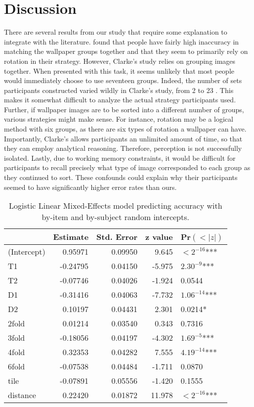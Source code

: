 \section{Discussion}
There are several results from our study that require some explanation to integrate with the literature. \citet{clarke} found that people have fairly high inaccuracy in matching the wallpaper groups together and that they seem to primarily rely on rotation in their strategy. However, Clarke's study relies on grouping images together. When presented with this task, it seems unlikely that most people would immediately choose to use seventeen groups. Indeed, the number of sets participants constructed varied wildly in Clarke's study, from 2 to 23 \citep{clarke}. This makes it somewhat difficult to analyze the actual strategy participants used. Further, if wallpaper images are to be sorted into a different number of groups, various strategies might make sense. For instance, rotation may be a logical method with six groups, as there are six types of rotation a wallpaper can have. Importantly, Clarke's allows participants an unlimited amount of time, so that they can employ analytical reasoning. Therefore, perception is not successfully isolated. Lastly, due to working memory constraints, it would be difficult for participants to recall precisely what type of image corresponded to each group as they continued to sort. These confounds could explain why their participants seemed to have significantly higher error rates than ours.

\begin{table}
\centering
\begin{tabular}{|l|rrrl|}
\hline
& Estimate & Std. Error & z value & Pr$(<|z|)$  \\ \hline
(Intercept) & 0.95971 &  0.09950 & 9.645 & $<2^{-16}$*** \\ \hline
T1 & -0.24795 &  0.04150 & -5.975 & $2.30^{-9}$*** \\ \hline
T2 & -0.07746 & 0.04026 & -1.924 & 0.0544 \\ \hline
D1 & -0.31416 & 0.04063 & -7.732 & $1.06^{-14}$*** \\ \hline
D2 & 0.10197 & 0.04431 & 2.301 & 0.0214* \\ \hline
2fold & 0.01214 & 0.03540 & 0.343 & 0.7316 \\ \hline
3fold & -0.18056 & 0.04197 & -4.302 & $1.69^{-5}$*** \\ \hline
4fold & 0.32353 & 0.04282 & 7.555 & $4.19^{-14}$*** \\ \hline
6fold & -0.07538 & 0.04484 & -1.711 & 0.0870 \\ \hline
tile & -0.07891 & 0.05556 & -1.420 & 0.1555 \\ \hline
distance & 0.22420 & 0.01872 & 11.978 & $<2^{-16}$*** \\ \hline
\end{tabular}
\caption{Logistic Linear Mixed-Effects model predicting accuracy with by-item and by-subject random intercepts. }
\label{fixeff}
\end{table}

